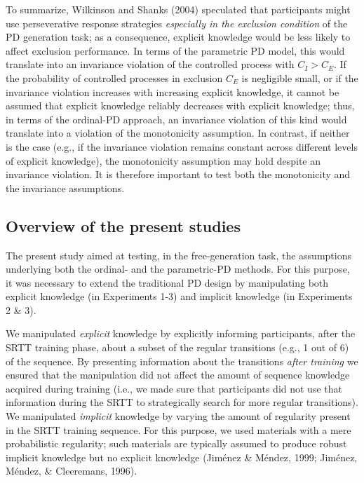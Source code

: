 \documentclass[man]{apa6}
\theoremstyle{definition}
\theoremstyle{definition}
\theoremstyle{definition}
\theoremstyle{remark}
\begin{document}
To summarize, Wilkinson and Shanks (2004) speculated that participants
might use perseverative response strategies \emph{especially in the
exclusion condition} of the PD generation task; as a consequence,
explicit knowledge would be less likely to affect exclusion performance.
In terms of the parametric PD model, this would translate into an
invariance violation of the controlled process with \(C_I > C_E\). If
the probability of controlled processes in exclusion \(C_E\) is
negligible small, or if the invariance violation increases with
increasing explicit knowledge, it cannot be assumed that explicit
knowledge reliably decreases with explicit knowledge; thus, in terms of
the ordinal-PD approach, an invariance violation of this kind would
translate into a violation of the monotonicity assumption. In contrast,
if neither is the case (e.g., if the invariance violation remains
constant across different levels of explicit knowledge), the
monotonicity assumption may hold despite an invariance violation. It is
therefore important to test both the monotonicity and the invariance
assumptions.

\subsection{Overview of the present
studies}\label{overview-of-the-present-studies}

The present study aimed at testing, in the free-generation task, the
assumptions underlying both the ordinal- and the parametric-PD methods.
For this purpose, it was necessary to extend the traditional PD design
by manipulating both explicit knowledge (in Experiments 1-3) and
implicit knowledge (in Experiments 2 \& 3).

We manipulated \emph{explicit} knowledge by explicitly informing
participants, after the SRTT training phase, about a subset of the
regular transitions (e.g., 1 out of 6) of the sequence. By presenting
information about the transitions \emph{after training} we ensured that
the manipulation did not affect the amount of sequence knowledge
acquired during training (i.e., we made sure that participants did not
use that information during the SRTT to strategically search for more
regular transitions). We manipulated \emph{implicit} knowledge by
varying the amount of regularity present in the SRTT training sequence.
For this purpose, we used materials with a mere probabilistic
regularity; such materials are typically assumed to produce robust
implicit knowledge but no explicit knowledge (Jiménez \& Méndez, 1999;
Jiménez, Méndez, \& Cleeremans, 1996).
\end{document}
